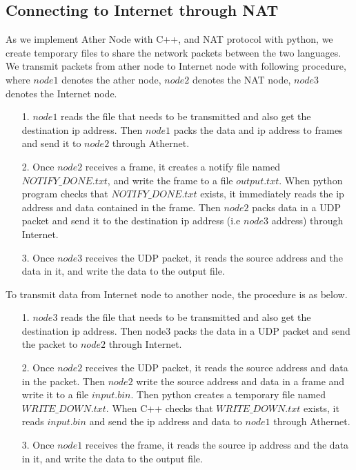 \documentclass[11pt, conference]{IEEEtran}
\begin{document}
\subsection{Connecting to Internet through NAT}

As we implement Ather Node with C++, and NAT protocol with python, we create temporary files to share the network packets
between the two languages. We transmit packets from ather node to Internet node with following procedure, where $node1$ denotes the ather node,
$node2$ denotes the NAT node, $node3$ denotes the Internet node.
\begin{enumerate}
    \item [1.] $node1$ reads the file that needs to be transmitted and also get the destination ip address. Then $node1$ packs the data and ip address to frames and send it to $node2$ through Athernet.
    \item [2.] Once $node2$ receives a frame, it creates a notify file named $NOTIFY\_DONE.txt$, and write the frame to a file $output.txt$. When python program checks that $NOTIFY\_DONE.txt$ exists,
                it immediately reads the ip address and data contained in the frame. Then $node2$ packs data in a UDP packet and send it to the destination ip address (i.e $node3$ address) through Internet.
    \item [3.] Once $node3$ receives the UDP packet, it reads the source address and the data in it, and write the data to the output file.            
\end{enumerate}
To transmit data from Internet node to another node, the procedure is as below.
\begin{enumerate}
    \item [1.] $node3$ reads the file that needs to be transmitted and also get the destination ip address. Then node3 packs the data in a UDP packet and send the packet to $node2$
               through Internet.
    \item [2.] Once $node2$ receives the UDP packet, it reads the source address and data in the packet. Then $node2$ write the source address and data in a frame and write it to a file $input.bin$. Then python creates a temporary
    file named $WRITE\_DOWN.txt$. When C++ checks that $WRITE\_DOWN.txt$ exists, it reads $input.bin$ and send the ip address and data to $node1$ through Athernet.
    \item [3.] Once $node1$ receives the frame, it reads the source ip address and the data in it, and write the data to the output file.
\end{enumerate}
\end{document}

